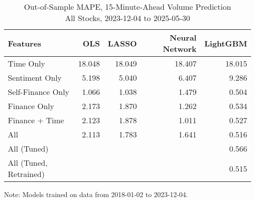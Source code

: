 \begin{table}[H]
\caption{
{ Out-of-Sample MAPE, 15-Minute-Ahead Volume Prediction} \\
{\small All Stocks, 2023-12-04 to 2025-05-30}
} 

\fontsize{12.0pt}{14.4pt}\selectfont

\begin{tabular*}{\linewidth}{@{\extracolsep{\fill}}lrrrr}
\toprule
Features & OLS & LASSO & Neural Network & LightGBM \\ 
\midrule\addlinespace[2.5pt]
Time Only & 18.048 & 18.049 & 18.407 & 18.015 \\
Sentiment Only & 5.198 & 5.040 & 6.407 & 9.286 \\
Self-Finance Only & 1.066 & 1.038 & 1.479 & 0.504 \\
Finance Only & 2.173 & 1.870 & 1.262 & 0.534 \\
Finance + Time & 2.123 & 1.878 & 1.011 & 0.527 \\
All & 2.113 & 1.783 & 1.641 & 0.516 \\
All (Tuned) &  &  &  & 0.566 \\
All (Tuned, Retrained) &  &  &  & 0.515 \\
\bottomrule
\end{tabular*}
\begin{minipage}{\linewidth}
Note: Models trained on data from 2018-01-02 to 2023-12-04.\\
\end{minipage}
\end{table}
